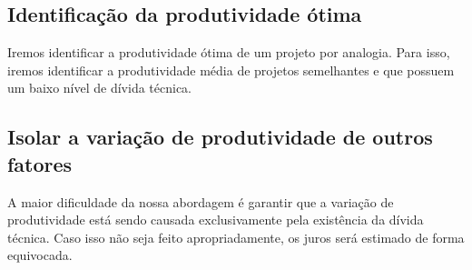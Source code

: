  \subsection{Identificação da produtividade ótima}
 
 
Iremos identificar a produtividade ótima de um projeto por analogia. Para isso, iremos identificar a produtividade média de projetos semelhantes e que possuem um baixo nível de dívida técnica. 
 
 
 
 \subsection{Isolar a variação de produtividade de outros fatores}
 
 A maior dificuldade da nossa abordagem é garantir que a variação de produtividade está sendo causada exclusivamente pela existência da dívida técnica. Caso isso não seja feito apropriadamente, os juros será estimado de forma equivocada.
 